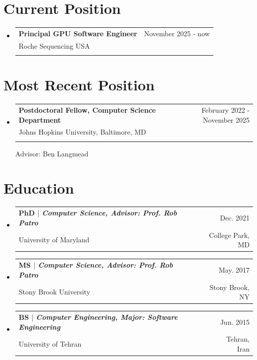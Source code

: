 \documentclass[A4,11pt]{article}
\makeatletter
\newcommand{\CVSubheading}[4]{
  \vspace{-2pt}\item
    \begin{tabular*}{0.97\textwidth}[t]{l@{\extracolsep{\fill}}r}
      \textbf{#1} & #2 \\
      \small#3 & \small #4 \\
    \end{tabular*}\vspace{-7pt}
}
\newcommand{\CVSubHeadingListStart}{\begin{itemize}[leftmargin=0.5cm, label={}]}
\newcommand{\CVSubHeadingListEnd}{\end{itemize}}
\makeatother
\begin{document}

\section{Current Position}
  \CVSubHeadingListStart
    \CVSubheading{Principal GPU Software Engineer}{November 2025 - now}
      {Roche Sequencing USA}\\
      { }{ }
  \CVSubHeadingListEnd

\section{Most Recent Position}
  \CVSubHeadingListStart
    \CVSubheading{Postdoctoral Fellow, Computer Science Department}{February 2022 - November 2025}
      {Johns Hopkins University, Baltimore, MD}\\
      {Advisor: Ben Langmead}{ }
  \CVSubHeadingListEnd


\section{Education}
  \CVSubHeadingListStart
    \CVSubheading
      {{PhD $|$ \emph{\small{Computer Science, Advisor: Prof. Rob Patro}}}}{Dec. 2021}
      {University of Maryland}{College Park, MD}
    \CVSubheading
      {{MS $|$ \emph{\small{Computer Science, Advisor: Prof. Rob Patro}}}}{May. 2017}
      {Stony Brook University}{Stony Brook, NY}
    \CVSubheading
      {{BS $|$ \emph{\small{Computer Engineering, Major: Software Engineering}}}}{Jun. 2015}
      {University of Tehran}{Tehran, Iran}
  \CVSubHeadingListEnd
\end{document}
